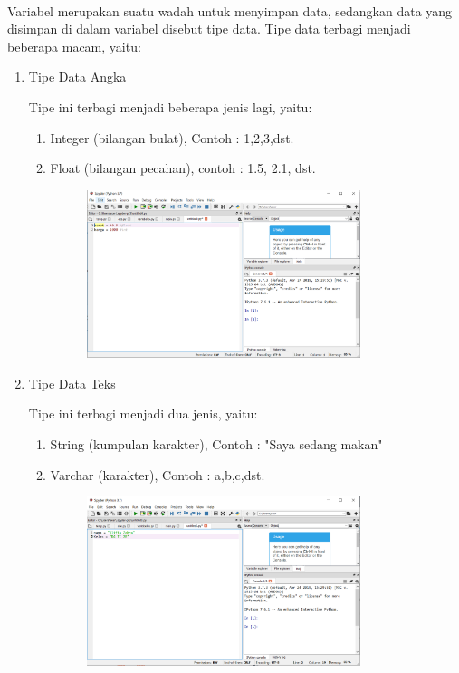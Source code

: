 \paragraph{}
    Variabel merupakan suatu wadah untuk menyimpan data, sedangkan data yang disimpan di dalam variabel disebut tipe data. Tipe data terbagi menjadi beberapa macam, yaitu:
    \begin{enumerate}
        \item Tipe Data Angka
            \par Tipe ini terbagi menjadi beberapa jenis lagi, yaitu: 
            \par \begin{enumerate}
                \item Integer (bilangan bulat), Contoh : 1,2,3,dst.
                \item Float (bilangan pecahan), contoh : 1.5, 2.1, dst.
                \begin{figure}[h]
                \centerline{\includegraphics[width=8cm]{figures/tipedataangka.PNG}}
                \end{figure}
                \end{enumerate}
            
        \item Tipe Data Teks
            \par Tipe ini terbagi menjadi dua jenis, yaitu:
            \par \begin{enumerate}
                \item String (kumpulan karakter), Contoh : "Saya sedang makan"
                \item Varchar (karakter), Contoh : a,b,c,dst.
                \begin{figure}[h]
                 \centerline{\includegraphics[width=8cm]{figures/tipedatastring.PNG}}

\end{figure}
\end{enumerate}
\end{enumerate}
